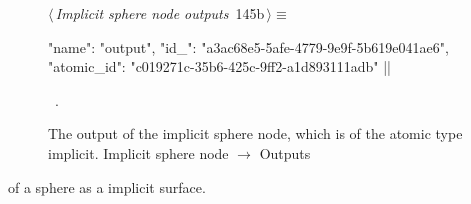 \documentclass[%
    a4paper,    %
    justified,  %
    nobib,      %
    openany     %
]{tufte-book}
\makeatletter
\renewcommand{\label}[1]{\@tufte@label{##1}}%
\makeatother
\begin{document}
\begin{figure}[!htbp]
\begin{flushleft} \small
\begin{minipage}{\linewidth}\label{scrap100}\raggedright\small
{} $\langle\,${\itshape Implicit sphere node outputs}\nobreak\ {\footnotesize {145b}}$\,\rangle\equiv$
\vspace{-1ex}
\begin{pythoncode}
{
    "name": "output",
    "id_": "a3ac68e5-5afe-4779-9e9f-5b619e041ae6",
    "atomic_id": "c019271c-35b6-425c-9ff2-a1d893111adb"
}|\NWsep|
\end{pythoncode}
\vspace{1.5ex}
\footnotesize
\begin{list}{}{\setlength{\itemsep}{-\parsep}\setlength{\itemindent}{-\leftmargin}}
\item \NWtxtMacroRefIn\ .

\item{}
\end{list}
\end{minipage}\vspace{4ex}
\end{flushleft}
\caption{The output of the implicit sphere node, which is of the atomic type
  implicit.
  \newline{}\newline{}Implicit sphere node $\rightarrow$ Outputs}
\end{figure}

 of a sphere
as a implicit surface.
\end{document}
